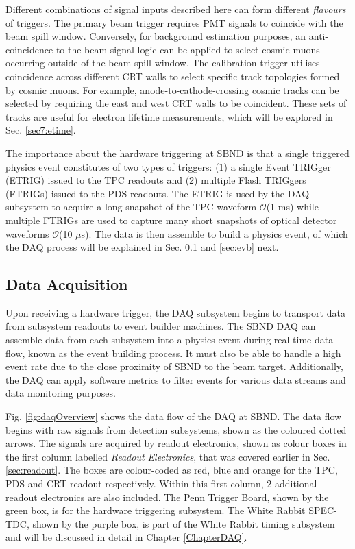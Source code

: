 Different combinations of signal inputs described here can form different \textit{flavours} of triggers.
The primary beam trigger requires PMT signals to coincide with the beam spill window.
Conversely, for background estimation purposes, an anti-coincidence to the beam signal logic can be applied to select cosmic muons occurring outside of the beam spill window.
The calibration trigger utilises coincidence across different CRT walls to select specific track topologies formed by cosmic muons.
For example, anode-to-cathode-crossing cosmic tracks can be selected by requiring the east and west CRT walls to be coincident.
These sets of tracks are useful for electron lifetime measurements, which will be explored in Sec. \ref{sec7:etime}.

The importance about the hardware triggering at SBND is that a single triggered physics event constitutes of two types of triggers: (1) a single Event TRIGger (ETRIG) issued to the TPC readouts and (2) multiple Flash TRIGgers (FTRIGs) issued to the PDS readouts.
The ETRIG is used by the DAQ subsystem to acquire a long snapshot of the TPC waveform $\mathcal{O}$(1 ms) while multiple FTRIGs are used to capture many short snapshots of optical detector waveforms $\mathcal{O}$(10 $\mu$s).
The data is then assemble to build a physics event, of which the DAQ process will be explained in Sec. \ref{sec4DAQOverview} and \ref{sec:evb} next.

\subsection{Data Acquisition}
\label{sec4DAQOverview}

Upon receiving a hardware trigger, the DAQ subsystem begins to transport data from subsystem readouts to event builder machines. 
The SBND DAQ can assemble data from each subsystem into a physics event during real time data flow, known as the event building process.
It must also be able to handle a high event rate due to the close proximity of SBND to the beam target.
Additionally, the DAQ can apply software metrics to filter events for various data streams and data monitoring purposes.

Fig. \ref{fig:daqOverview} shows the data flow of the DAQ at SBND.
The data flow begins with raw signals from detection subsystems, shown as the coloured dotted arrows.
The signals are acquired by readout electronics, shown as colour boxes in the first column labelled \textit{Readout Electronics}, that was covered earlier in Sec. \ref{sec:readout}.
The boxes are colour-coded as red, blue and orange for the TPC, PDS and CRT readout respectively.
Within this first column, 2 additional readout electronics are also included.
The Penn Trigger Board, shown by the green box, is for the hardware triggering subsystem.
The White Rabbit SPEC-TDC, shown by the purple box, is part of the White Rabbit timing subsystem and will be discussed in detail in Chapter \ref{ChapterDAQ}.

